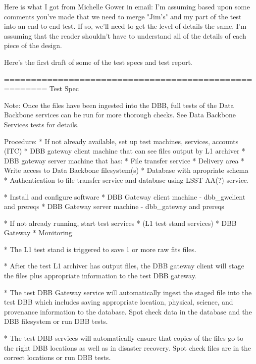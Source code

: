 \documentclass[DM,obsolete,STS,toc]{lsstdoc}
\begin{document}




Here is what I got from Michelle Gower in email: 
I'm assuming based upon some comments you've made that we need to merge "Jim's" and my part of the test into an end-to-end test.      If so, we'll need to get the level of details the same.    I'm assuming that the reader shouldn't have to understand all of the details of each piece of the design.    

Here's the first draft of some of the test specs and test report.

======================================================
Test Spec

Note: Once the files have been ingested into the DBB, full tests of the 
   Data Backbone services can be run for more thorough
   checks.    See Data Backbone Services tests for details.    

Procedure:
* If not already available, set up test machines,
  services, accounts (ITC)
    * DBB gateway client machine that can see files output by L1 archiver
    * DBB gateway server machine that has:
        * File transfer service
        * Delivery area
        * Write access to Data Backbone filesystem(s)
    * Database with apropriate schema
    * Authentication to file transfer service and database using LSST AA(?) service.

* Install and configure software
    * DBB Gateway client machine - dbb\_gwclient and prereqs
    * DBB Gateway server machine - dbb\_gateway and prereqs

* If not already running, start test services
    * (L1 test stand services)
    * DBB Gateway
    * Monitoring

* The L1 test stand is triggered to save 1 or more raw fits files.

* After the test L1 archiver has output files,
  the DBB gateway client will stage the files plus appropriate
  information to the test DBB gateway.

* The test DBB Gateway service will automatically
  ingest the staged file into the test DBB which
  includes saving appropriate location, physical, science,
  and provenance information to the database.   Spot check data 
  in the database and the DBB filesystem or run DBB tests.

* The test DBB services will automatically ensure that
  copies of the files go to the right DBB locations as well
  as in disaster recovery.    Spot check files are in the correct 
  locations or run DBB tests.
 
\end{document}
